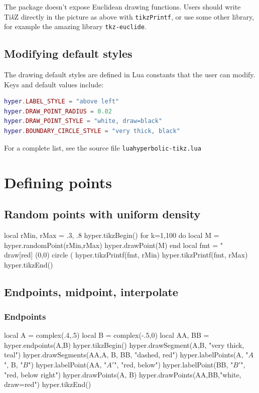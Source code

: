 \documentclass{article}
\newcommand{\TikZ}{Ti\emph{k}Z}
\begin{document}
The package doesn't expose Euclidean drawing functions.
Users should write \TikZ{} directly in the picture as above with \texttt{tikzPrintf}, or use some other library, for example the amazing library \texttt{tkz-euclide}. 

 
\subsection{Modifying default styles}

The drawing default styles are defined in Lua constants that the user can modify. Keys and default values include:
\begin{lstlisting}[language=Lua]
hyper.LABEL_STYLE = "above left"
hyper.DRAW_POINT_RADIUS = 0.02
hyper.DRAW_POINT_STYLE = "white, draw=black"
hyper.BOUNDARY_CIRCLE_STYLE = "very thick, black"
\end{lstlisting}

For a complete list, see the source file \verb+luahyperbolic-tikz.lua+

\section{Defining points}

\subsection{Random points with uniform density}

\begin{codeandresult}
\begin{luacode*}
local rMin, rMax = .3, .8
hyper.tikzBegin()
for k=1,100 do
	local M = hyper.randomPoint(rMin,rMax)
	hyper.drawPoint(M)
end
local fmt = "\\draw[red] (0,0) circle (%
hyper.tikzPrintf(fmt, rMin)
hyper.tikzPrintf(fmt, rMax)
hyper.tikzEnd()
\end{luacode*}
\end{codeandresult}

\subsection{Endpoints, midpoint, interpolate}



\subsubsection{Endpoints}
\begin{codeandresult}
\begin{luacode*}
local A = complex(.4,.5)
local B = complex(-.5,0)
local AA, BB = hyper.endpoints(A,B)
hyper.tikzBegin()
hyper.drawSegment(A,B, "very thick, teal")
hyper.drawSegments(AA,A, B, BB, "dashed, red")
hyper.labelPoints(A, "$A$", B, "$B$")
hyper.labelPoint(AA, "$A'$", "red, below")
hyper.labelPoint(BB, "$B'$", "red, below right")
hyper.drawPoints(A, B)
hyper.drawPoints(AA,BB,"white, draw=red")
hyper.tikzEnd()
\end{luacode*}
\end{codeandresult}
\end{document}
